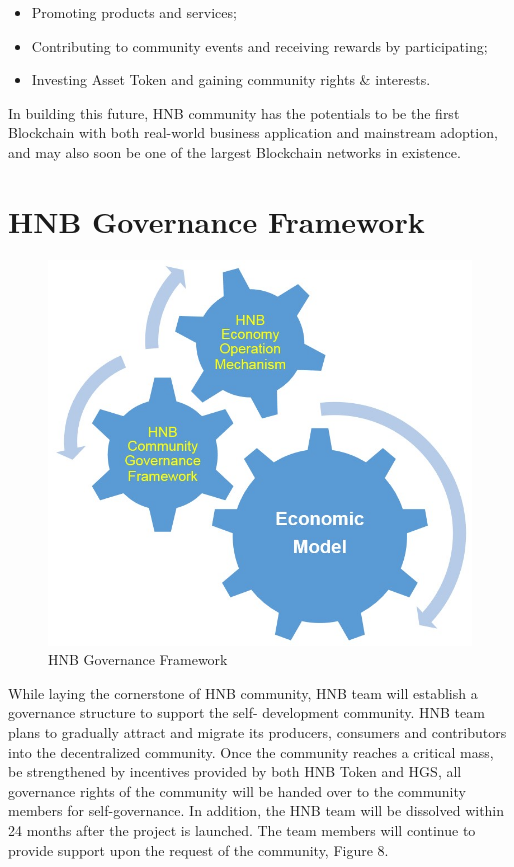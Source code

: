 \documentclass[fleqn,10pt]{SelfArx} %
\begin{document}
\begin{itemize}
\item{Promoting products and services; }
\item{Contributing to community events and receiving rewards by participating; }
\item{Investing Asset Token and gaining community rights \& interests. }
\end{itemize}

In building this future, HNB community has the potentials to be the first Blockchain with both real-world business application and mainstream adoption, and may also soon be one of the largest Blockchain networks in existence. \\


\section{HNB Governance Framework}

\begin{figure}[ht]\centering
\includegraphics[width=\linewidth]{8}
\caption{HNB Governance Framework}
\label{fig:8}
\end{figure}

While laying the cornerstone of HNB community, HNB team will establish a governance structure to support the self-
development community. HNB team plans to gradually attract and migrate its producers, consumers and contributors into the decentralized community. Once the community reaches a critical mass, be strengthened by incentives provided by both HNB Token and HGS, all governance rights of the community will be handed over to the community members for self-governance. In addition, the HNB team will be dissolved within 24 months after the project is launched. The team members will continue to provide support upon the request of the community, Figure 8.
\end{document}
